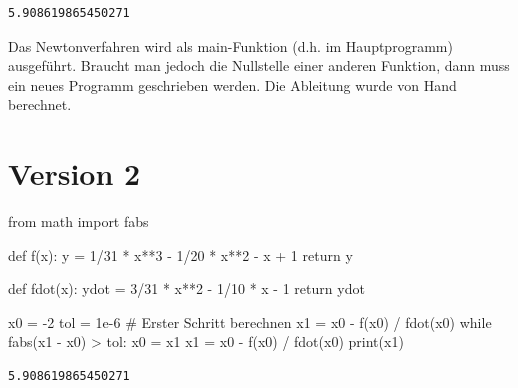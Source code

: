 \documentclass[
  a4paper,
  DIV=11]{scrreprt}
\newenvironment{Shaded}{\begin{snugshade}}{\end{snugshade}}
\newcommand{\BuiltInTok}[1]{\textcolor[rgb]{0.00,0.23,0.31}{#1}}
\newcommand{\CommentTok}[1]{\textcolor[rgb]{0.37,0.37,0.37}{#1}}
\newcommand{\ControlFlowTok}[1]{\textcolor[rgb]{0.00,0.23,0.31}{#1}}
\newcommand{\DecValTok}[1]{\textcolor[rgb]{0.68,0.00,0.00}{#1}}
\newcommand{\FloatTok}[1]{\textcolor[rgb]{0.68,0.00,0.00}{#1}}
\newcommand{\ImportTok}[1]{\textcolor[rgb]{0.00,0.46,0.62}{#1}}
\newcommand{\KeywordTok}[1]{\textcolor[rgb]{0.00,0.23,0.31}{#1}}
\newcommand{\NormalTok}[1]{\textcolor[rgb]{0.00,0.23,0.31}{#1}}
\newcommand{\OperatorTok}[1]{\textcolor[rgb]{0.37,0.37,0.37}{#1}}
\theoremstyle{definition}
\theoremstyle{definition}
\theoremstyle{remark}
\begin{document}
\begin{tcolorbox}
\begin{verbatim}
5.908619865450271
\end{verbatim}

Das Newtonverfahren wird als main-Funktion (d.h. im Hauptprogramm)
ausgeführt. Braucht man jedoch die Nullstelle einer anderen Funktion,
dann muss ein neues Programm geschrieben werden. Die Ableitung wurde von
Hand berechnet.

\section{Version 2}

\begin{Shaded}
\begin{Highlighting}[]
\ImportTok{from}\NormalTok{ math }\ImportTok{import}\NormalTok{ fabs}

\KeywordTok{def}\NormalTok{ f(x):}
\NormalTok{    y }\OperatorTok{=} \DecValTok{1}\OperatorTok{/}\DecValTok{31} \OperatorTok{*}\NormalTok{ x}\OperatorTok{**}\DecValTok{3} \OperatorTok{{-}} \DecValTok{1}\OperatorTok{/}\DecValTok{20} \OperatorTok{*}\NormalTok{ x}\OperatorTok{**}\DecValTok{2} \OperatorTok{{-}}\NormalTok{ x }\OperatorTok{+} \DecValTok{1}
    \ControlFlowTok{return}\NormalTok{ y}

\KeywordTok{def}\NormalTok{ fdot(x):}
\NormalTok{    ydot }\OperatorTok{=} \DecValTok{3}\OperatorTok{/}\DecValTok{31} \OperatorTok{*}\NormalTok{ x}\OperatorTok{**}\DecValTok{2} \OperatorTok{{-}} \DecValTok{1}\OperatorTok{/}\DecValTok{10} \OperatorTok{*}\NormalTok{ x }\OperatorTok{{-}} \DecValTok{1}
    \ControlFlowTok{return}\NormalTok{ ydot}

\NormalTok{x0 }\OperatorTok{=} \OperatorTok{{-}}\DecValTok{2}
\NormalTok{tol }\OperatorTok{=} \FloatTok{1e{-}6}
\CommentTok{\# Erster Schritt berechnen}
\NormalTok{x1 }\OperatorTok{=}\NormalTok{ x0 }\OperatorTok{{-}}\NormalTok{ f(x0) }\OperatorTok{/}\NormalTok{ fdot(x0)}
\ControlFlowTok{while}\NormalTok{ fabs(x1 }\OperatorTok{{-}}\NormalTok{ x0) }\OperatorTok{\textgreater{}}\NormalTok{ tol:}
\NormalTok{    x0 }\OperatorTok{=}\NormalTok{ x1}
\NormalTok{    x1 }\OperatorTok{=}\NormalTok{ x0 }\OperatorTok{{-}}\NormalTok{ f(x0) }\OperatorTok{/}\NormalTok{ fdot(x0)}
\BuiltInTok{print}\NormalTok{(x1)}
\end{Highlighting}
\end{Shaded}

\begin{verbatim}
5.908619865450271
\end{verbatim}


\end{tcolorbox}
\end{document}
